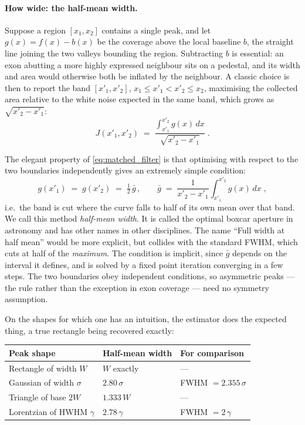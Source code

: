 \documentclass[11pt]{article}
\begin{document}
\paragraph{How wide: the half-mean width.}
Suppose a region $[x_1,x_2]$ contains a single peak, and let
$g(x) = f(x) - b(x)$ be the coverage above the local baseline $b$, the
straight line joining the two valleys bounding the region. Subtracting
$b$ is essential: an exon abutting a more highly expressed neighbour
sits on a pedestal, and its width and area would otherwise both be
inflated by the neighbour.
A classic choice is then to report the band $[x'_1,x'_2]$,
$x_1 \leq x'_1 < x'_2 \leq x_2$, maximising the collected area relative
to the white noise expected in the same band, which grows as
$\sqrt{x'_2 - x'_1}$:
\begin{equation}
  J(x'_1,x'_2) \;=\;
  \frac{\displaystyle\int_{x'_1}^{x'_2} g(x)\,dx}{\sqrt{x'_2 - x'_1}}\;.
  \label{eq:matched_filter}
\end{equation}

The elegant property of \eqref{eq:matched_filter} is that optimising
with respect to the two boundaries independently gives an extremely
simple condition:
\begin{equation}
  g(x'_1) \;=\; g(x'_2) \;=\;
  \tfrac{1}{2}\,\bar g\,,
  \qquad
  \bar g \;=\; \frac{1}{x'_2 - x'_1}\int_{x'_1}^{x'_2} g(x)\,dx\;,
  \label{eq:half_mean}
\end{equation}
i.e.\ the band is cut where the curve falls to half of its own mean over
that band. We call this method \emph{half-mean width}.
It is called the optimal boxcar aperture in astronomy and has other
names in other disciplines.
The name ``Full width at half
mean'' would be more explicit, but collides with the standard FWHM,
which cuts at half of the \emph{maximum}. The condition is implicit,
since $\bar g$ depends on the interval it defines, and is solved by a
fixed point iteration converging in a few steps. The two boundaries obey
independent conditions, so asymmetric peaks --- the rule rather than the
exception in exon coverage --- need no symmetry assumption.

On the shapes for which one has an intuition, the estimator does the
expected thing, a true rectangle being recovered exactly:

\begin{center}
\begin{tabular}{lll}
\toprule
Peak shape & Half-mean width & For comparison \\
\midrule
Rectangle of width $W$      & $W$ exactly     & --- \\
Gaussian of width $\sigma$  & $2.80\,\sigma$  & FWHM $= 2.355\,\sigma$ \\
Triangle of base $2W$       & $1.333\,W$      & --- \\
Lorentzian of HWHM $\gamma$ & $2.78\,\gamma$  & FWHM $= 2\,\gamma$ \\
\bottomrule
\end{tabular}
\end{center}
\end{document}
